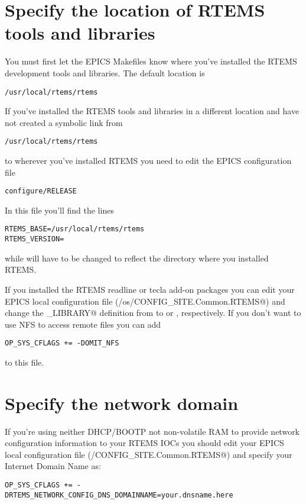 \documentclass{report}
\begin{document}
\section{Specify the location of RTEMS tools and libraries}
You must first let the EPICS Makefiles know where you've installed
the RTEMS development tools and libraries.  The default location is
\begin{alltt}
/usr/local/rtems/rtems\rtemsToolVersion
\end{alltt}
If you've installed the RTEMS tools and libraries in a different location and
have not created a symbolic link from
\begin{alltt}
/usr/local/rtems/rtems\rtemsToolVersion
\end{alltt}
to wherever you've installed RTEMS you need to edit the EPICS configuration
file
\begin{verbatim}
configure/RELEASE
\end{verbatim}
In this file you'll find the lines
\begin{alltt}
RTEMS_BASE=/usr/local/rtems/rtems\rtemsToolVersion
RTEMS_VERSION=\rtemsToolVersion
\end{alltt}
while will have to be changed to reflect the directory where you installed RTEMS.

If you installed the RTEMS readline or tecla add-on packages you can edit
your EPICS local configuration file (\verb@configure/os/CONFIG_SITE.Common.RTEMS@)
and change the \verb@EPICSCOMMANDLINE_LIBRARY@ definition from \verb@EPICS@ to
\verb@READLINE@ or \verb@LIBTECLA@, respectively.
If you don't want to use NFS to access remote files you can add
\begin{verbatim}
OP_SYS_CFLAGS += -DOMIT_NFS
\end{verbatim}
to this file.

\section{Specify the network domain}
If you're using neither DHCP/BOOTP not non-volatile RAM to provide network
configuration information to your RTEMS IOCs you should edit
your EPICS local configuration file (\verb@configure/CONFIG_SITE.Common.RTEMS@)
and specify your Internet Domain Name as:
\begin{verbatim}
OP_SYS_CFLAGS += -DRTEMS_NETWORK_CONFIG_DNS_DOMAINNAME=your.dnsname.here
\end{verbatim}
\end{document}
